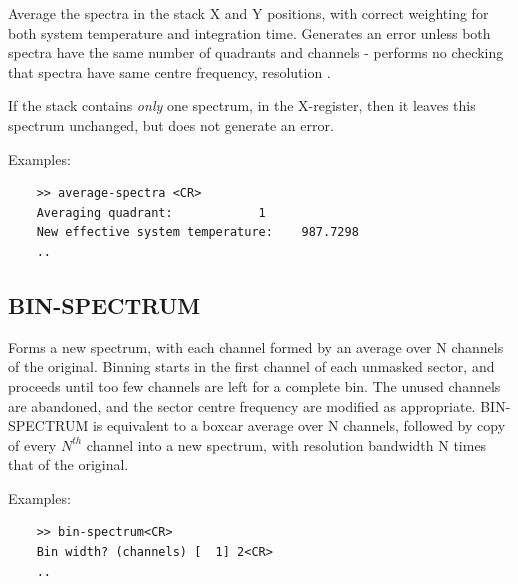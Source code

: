 \documentclass[11pt,twoside]{report}
\begin{document}
Average the spectra in the stack X and Y positions, with correct weighting
for both system temperature and integration time. Generates an error unless
both spectra have the same number of quadrants and channels - performs no
checking that spectra have same centre frequency, resolution \etc.

If the stack contains {\em only} one spectrum, in the X-register, then it
leaves this spectrum unchanged, but does not generate an error.

Examples:
\begin{verbatim}
    >> average-spectra <CR>
    Averaging quadrant:            1
    New effective system temperature:    987.7298    
    ..
\end{verbatim}

\subsection{BIN-SPECTRUM} 

Forms a new spectrum, with each channel formed by an average over N channels of
the original. Binning starts in the first channel of each unmasked sector, and
proceeds until too few channels are left for a complete bin. The unused
channels are abandoned, and the sector centre frequency \etc are modified as
appropriate. BIN-SPECTRUM is equivalent to a boxcar average over N channels,
followed by copy of every $N^{th}$ channel into a new spectrum, with resolution
bandwidth N times that of the original. 

Examples:
\begin{verbatim}
    >> bin-spectrum<CR>
    Bin width? (channels) [  1] 2<CR>
    ..
\end{verbatim}
\end{document}
